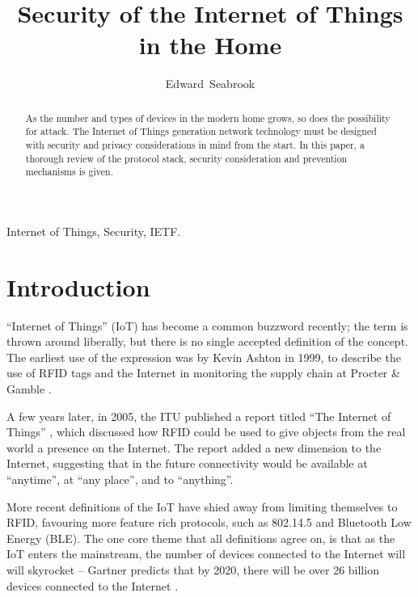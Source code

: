 \documentclass[10pt,journal,compsoc]{IEEEtran}
\begin{document}
\title{Security of the Internet of Things in the Home}
\author{Edward~Seabrook }

\maketitle


\begin{abstract}
As the number and types of devices in the modern home grows, so does the
possibility for attack. The Internet of Things generation network technology
must be designed with security and privacy considerations in mind from the
start. In this paper, a thorough review of the protocol stack, security
consideration and prevention mechanisms is given. 
\end{abstract}

\begin{IEEEkeywords}
Internet of Things, Security, IETF.
\end{IEEEkeywords}

\IEEEpeerreviewmaketitle

\section{Introduction}
 ``Internet of Things'' (IoT) has become a common buzzword
recently; the term is thrown around liberally, but there is no single accepted
definition of the concept. The earliest use of the expression was by Kevin
Ashton in 1999, to describe the use of RFID tags and the Internet in monitoring
the supply chain at Procter \& Gamble \cite{Ashton2009}. 

A few years later, in 2005, the ITU published a report titled ``The Internet of
Things'' \cite{ITU_IoT}, which discussed how RFID could be used to give objects
from the real world a presence on the Internet. The report added a new
dimension to the Internet, suggesting that in the future connectivity would be
available at ``anytime'', at ``any place'', and to ``anything''.

More recent definitions of the IoT have shied away from limiting themselves to
RFID, favouring more feature rich protocols, such as 802.14.5 and Bluetooth Low
Energy (BLE). The one core theme that all definitions agree on, is that as the
IoT enters the mainstream, the number of devices connected to the Internet will
will skyrocket -- Gartner predicts that by 2020, there will be over 26 billion
devices connected to the Internet \cite{Gartner2014}. 
\end{document}
